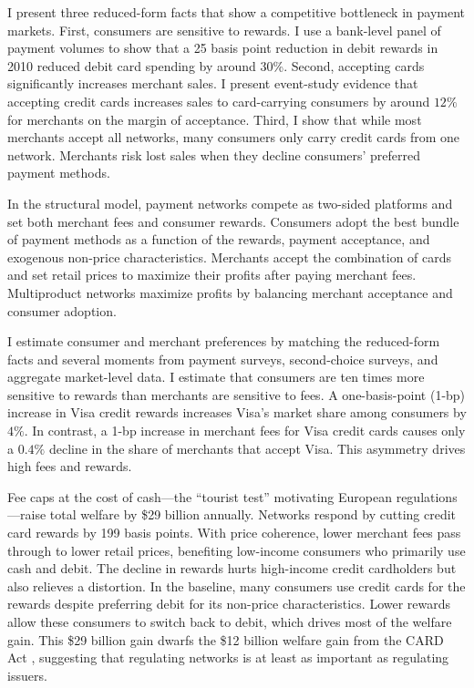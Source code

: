 \documentclass[main.tex]{subfiles}
\begin{document}
I present three reduced-form facts that show a competitive bottleneck in payment markets.
First, consumers are sensitive to rewards.
I use a bank-level panel of payment volumes to show that a 25 basis point reduction in debit rewards in 2010 reduced debit card spending by around 30\%.
Second, accepting cards significantly increases merchant sales.
I present event-study evidence that accepting credit cards increases sales to card-carrying consumers by around $12\%$ for merchants on the margin of acceptance.
Third, I show that while most merchants accept all networks, many consumers only carry credit cards from one network.
Merchants risk lost sales when they decline consumers' preferred payment methods.

In the structural model, payment networks compete as two-sided platforms and set both merchant fees and consumer rewards.
Consumers adopt the best bundle of payment methods as a function of the rewards, payment acceptance, and exogenous non-price characteristics.
Merchants accept the combination of cards and set retail prices to maximize their profits after paying merchant fees.
Multiproduct networks maximize profits by balancing merchant acceptance and consumer adoption.

I estimate consumer and merchant preferences by matching the reduced-form facts and several moments from payment surveys, second-choice surveys, and aggregate market-level data.
I estimate that consumers are ten times more sensitive to rewards than merchants are sensitive to fees.
A one-basis-point (1-bp) increase in Visa credit rewards increases Visa's market share among consumers by $4\%$.
In contrast, a 1-bp increase in merchant fees for Visa credit cards causes only a $0.4\%$ decline in the share of merchants that accept Visa.
This asymmetry drives high fees and rewards.

Fee caps at the cost of cash—the ``tourist test'' motivating European regulations—raise total welfare by \$29 billion annually.
Networks respond by cutting credit card rewards by 199 basis points.
With price coherence, lower merchant fees pass through to lower retail prices, benefiting low-income consumers who primarily use cash and debit.
The decline in rewards hurts high-income credit cardholders but also relieves a distortion.
In the baseline, many consumers use credit cards for the rewards despite preferring debit for its non-price characteristics.
Lower rewards allow these consumers to switch back to debit, which drives most of the welfare gain.
This \$29 billion gain dwarfs the \$12 billion welfare gain from the CARD Act \parencite{Agarwal.etal2015}, suggesting that regulating networks is at least as important as regulating issuers.
\end{document}

